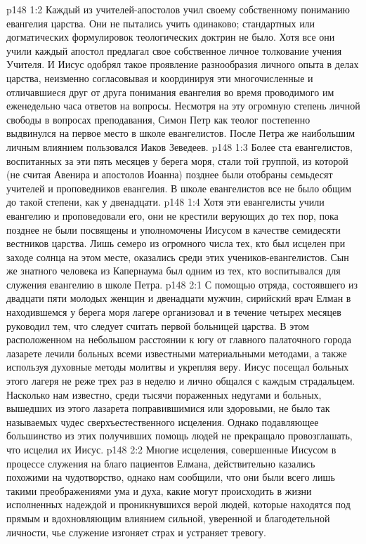 \vs p148 1:2 Каждый из учителей\hyp{}апостолов учил своему собственному пониманию евангелия царства. Они не пытались учить одинаково; стандартных или догматических формулировок теологических доктрин не было. Хотя все они учили  каждый апостол предлагал свое собственное личное толкование учения Учителя. И Иисус одобрял такое проявление разнообразия личного опыта в делах царства, неизменно согласовывая и координируя эти многочисленные и отличавшиеся друг от друга понимания евангелия во время проводимого им еженедельно часа ответов на вопросы. Несмотря на эту огромную степень личной свободы в вопросах преподавания, Симон Петр как теолог постепенно выдвинулся на первое место в школе евангелистов. После Петра же наибольшим личным влиянием пользовался Иаков Зеведеев.
\vs p148 1:3 Более ста евангелистов, воспитанных за эти пять месяцев у берега моря, стали той группой, из которой (не считая Авенира и апостолов Иоанна) позднее были отобраны семьдесят учителей и проповедников евангелия. В школе евангелистов все не было общим до такой степени, как у двенадцати.
\vs p148 1:4 Хотя эти евангелисты учили евангелию и проповедовали его, они не крестили верующих до тех пор, пока позднее не были посвящены и уполномочены Иисусом в качестве семидесяти вестников царства. Лишь семеро из огромного числа тех, кто был исцелен при заходе солнца на этом месте, оказались среди этих учеников\hyp{}евангелистов. Сын же знатного человека из Капернаума был одним из тех, кто воспитывался для служения евангелию в школе Петра.
\vs p148 2:1 С помощью отряда, состоявшего из двадцати пяти молодых женщин и двенадцати мужчин, сирийский врач Елман в находившемся у берега моря лагере организовал и в течение четырех месяцев руководил тем, что следует считать первой больницей царства. В этом расположенном на небольшом расстоянии к югу от главного палаточного города лазарете лечили больных всеми известными материальными методами, а также используя духовные методы молитвы и укрепляя веру. Иисус посещал больных этого лагеря не реже трех раз в неделю и лично общался с каждым страдальцем. Насколько нам известно, среди тысячи пораженных недугами и больных, вышедших из этого лазарета поправившимися или здоровыми, не было так называемых чудес сверхъестественного исцеления. Однако подавляющее большинство из этих получивших помощь людей не прекращало провозглашать, что исцелил их Иисус.
\vs p148 2:2 Многие исцеления, совершенные Иисусом в процессе служения на благо пациентов Елмана, действительно казались похожими на чудотворство, однако нам сообщили, что они были всего лишь такими преображениями ума и духа, какие могут происходить в жизни исполненных надеждой и проникнувшихся верой людей, которые находятся под прямым и вдохновляющим влиянием сильной, уверенной и благодетельной личности, чье служение изгоняет страх и устраняет тревогу.
